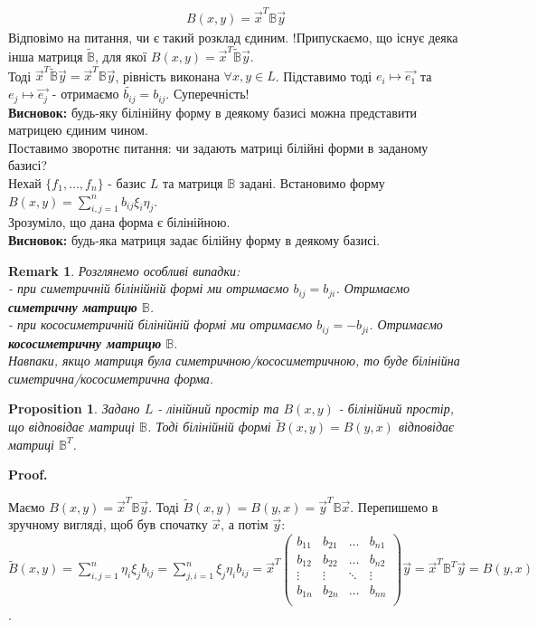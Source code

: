 \documentclass[a4paper, 10pt]{article}
\makeatletter
\def\huge{\displaystyle}
\def\qed{$\blacksquare$}
\theoremstyle{theoremdd}
\theoremstyle{theoremdd}
\theoremstyle{theoremdd}
\theoremstyle{theoremdd}
\theoremstyle{theoremdd}
\newtheorem{proposition}[theorem]{Proposition}
\theoremstyle{theoremdd}
\newtheorem{remark}[theorem]{Remark}
\theoremstyle{theoremdd}
\theoremstyle{theoremdd}
\renewenvironment{proof}[1][Proof.\\]{\par
\pushQED{\hfill \qed}%
\normalfont \topsep6\p@\@plus6\p@\relax
\trivlist
\item\relax
{\bfseries
#1\@addpunct{.}}\hspace\labelsep\ignorespaces
}{%
\popQED\endtrivlist\@endpefalse
}
\makeatother
\begin{document}
\begin{align*}
B(x,y) = \vec{x}^T \mathbb{B} \vec{y}
\end{align*}
Відповімо на питання, чи є такий розклад єдиним. !Припускаємо, що існує деяка інша матриця $\tilde{\mathbb{B}}$, для якої $B(x,y) = \vec{x}^T \tilde{\mathbb{B}} \vec{y}$.\\
Тоді $\vec{x}^T \tilde{\mathbb{B}} \vec{y} = \vec{x}^T \mathbb{B} \vec{y}$, рівність виконана $\forall x,y \in L$. Підставимо тоді $e_i \mapsto \vec{e_1}$ та $e_j \mapsto \vec{e_j}$ - отримаємо $\tilde{b_{ij}} = b_{ij} $. Суперечність!\\
\textbf{Висновок:} будь-яку білінійну форму в деякому базисі можна представити матрицею єдиним чином.
\bigskip \\
Поставимо зворотнє питання: чи задають матриці білійні форми в заданому базисі?\\
Нехай $\{f_1,\dots,f_n\}$ - базис $L$ та матриця $\mathbb{B}$ задані. Встановимо форму $B(x,y) = \huge\sum_{i,j=1}^n b_{ij}\xi_i \eta_j$.\\
Зрозуміло, що дана форма є білінійною.\\
\textbf{Висновок:} будь-яка матриця задає білійну форму в деякому базисі.

\begin{remark}
Розглянемо особливі випадки:\\
- при симетричній білінійній формі ми отримаємо $b_{ij} = b_{ji}$. Отримаємо \textbf{симетричну матрицю} $\mathbb{B}$.\\
- при кососиметричній білінійній формі ми отримаємо $b_{ij} = -b_{ji}$. Отримаємо \textbf{кососиметричну матрицю} $\mathbb{B}$.\\
Навпаки, якщо матриця була симетричною/кососиметричною, то буде білінійна симетрична/кососиметрична форма.
\end{remark}

\begin{proposition}
Задано $L$ - лінійний простір та $B(x,y)$ - білінійний простір, що відповідає матриці $\mathbb{B}$. Тоді білінійній формі $\tilde{B}(x,y) = B(y,x)$ відповідає матриці $\mathbb{B}^T$.
\end{proposition}

\begin{proof}
Маємо $B(x,y) = \vec{x}^T \mathbb{B} \vec{y}$. Тоді $\tilde{B}(x,y) = B(y,x) = \vec{y}^T \mathbb{B} \vec{x}$. Перепишемо в зручному вигляді, щоб був спочатку $\vec{x}$, а потім $\vec{y}$:\\
$\tilde{B}(x,y) = \huge\sum_{i,j=1}^n \eta_i \xi_j b_{ij} = \huge\sum_{j,i=1}^n \xi_j \eta_i b_{ij} = \vec{x}^T \begin{pmatrix}
b_{11} & b_{21} & \dots & b_{n1} \\
b_{12} & b_{22} & \dots & b_{n2} \\
\vdots & \vdots & \ddots & \vdots \\
b_{1n} & b_{2n} & \dots & b_{nn} \\
\end{pmatrix} \vec{y} = \vec{x}^T \mathbb{B}^T \vec{y} = B(y,x)$.
\end{proof}
\end{document}
